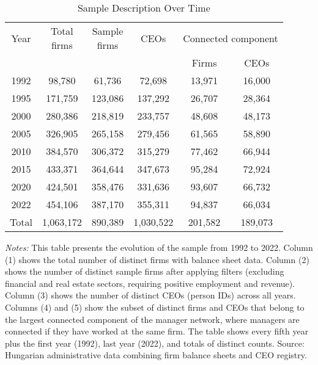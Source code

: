 \begin{table}[htbp]
\centering
\caption{Sample Description Over Time}
\label{tab:sample}
\begin{tabular}{*{6}{c}}
\toprule
Year & \shortstack{Total\\firms} & \shortstack{Sample\\firms} & CEOs & \multicolumn{2}{c}{Connected component} \\
\cmidrule(lr){5-6}
 & & & & Firms & CEOs \\
\midrule
1992 &       98,780 &       61,736 &       72,698 &       13,971 &       16,000 \\
1995 &      171,759 &      123,086 &      137,292 &       26,707 &       28,364 \\
2000 &      280,386 &      218,819 &      233,757 &       48,608 &       48,173 \\
2005 &      326,905 &      265,158 &      279,456 &       61,565 &       58,890 \\
2010 &      384,570 &      306,372 &      315,279 &       77,462 &       66,944 \\
2015 &      433,371 &      364,644 &      347,673 &       95,284 &       72,924 \\
2020 &      424,501 &      358,476 &      331,636 &       93,607 &       66,732 \\
2022 &      454,106 &      387,170 &      355,311 &       94,837 &       66,034 \\
\midrule
Total &    1,063,172 &      890,389 &    1,030,522 &      201,582 &      189,073 \\
\bottomrule
\end{tabular}
\begin{minipage}{12cm}
\footnotesize
\textit{Notes:} This table presents the evolution of the sample from 1992 to 2022. Column (1) shows the total number of distinct firms with balance sheet data. Column (2) shows the number of distinct sample firms after applying filters (excluding financial and real estate sectors, requiring positive employment and revenue). Column (3) shows the number of distinct CEOs (person IDs) across all years. Columns (4) and (5) show the subset of distinct firms and CEOs that belong to the largest connected component of the manager network, where managers are connected if they have worked at the same firm. The table shows every fifth year plus the first year (1992), last year (2022), and totals of distinct counts. Source: Hungarian administrative data combining firm balance sheets and CEO registry.
\end{minipage}
\end{table}
